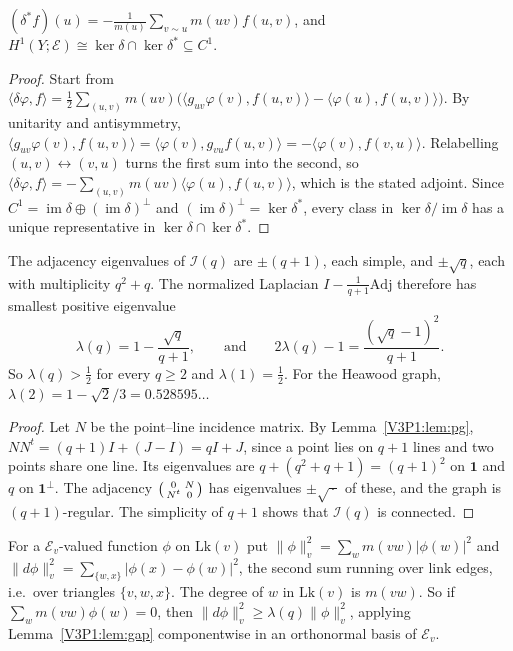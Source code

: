 \begin{lemma}\label{V3P1:lem:adjoint}
$(\delta^{*}f)(u)=-\frac1{m(u)}\sum_{v\sim u}m(uv)f(u,v)$, and
$H^{1}(Y;\mathcal E)\cong\ker\delta\cap\ker\delta^{*}\subseteq C^{1}$.
\end{lemma}

\begin{proof}
Start from $\langle\delta\varphi,f\rangle=\tfrac12\sum_{(u,v)}m(uv)\bigl(\langle g_{uv}\varphi(v),
f(u,v)\rangle-\langle\varphi(u),f(u,v)\rangle\bigr)$. By unitarity and antisymmetry,
$\langle g_{uv}\varphi(v),f(u,v)\rangle=\langle\varphi(v),g_{vu}f(u,v)\rangle
=-\langle\varphi(v),f(v,u)\rangle$. Relabelling $(u,v)\leftrightarrow(v,u)$ turns the first
sum into the second, so $\langle\delta\varphi,f\rangle=-\sum_{(u,v)}m(uv)\langle\varphi(u),
f(u,v)\rangle$, which is the stated adjoint. Since $C^{1}=\operatorname{im}\delta\oplus
(\operatorname{im}\delta)^{\perp}$ and $(\operatorname{im}\delta)^{\perp}=\ker\delta^{*}$,
every class in $\ker\delta/\operatorname{im}\delta$ has a unique representative in
$\ker\delta\cap\ker\delta^{*}$.
\end{proof}

\begin{lemma}\label{V3P1:lem:gap}
The adjacency eigenvalues of $\mathcal I(q)$ are $\pm(q+1)$, each simple, and $\pm\sqrt q$,
each with multiplicity $q^{2}+q$. The normalized Laplacian $I-\frac1{q+1}\mathrm{Adj}$
therefore has smallest positive eigenvalue
\[
\lambda(q)=1-\frac{\sqrt q}{q+1},\qquad\text{and}\qquad 2\lambda(q)-1=\frac{(\sqrt q-1)^{2}}{q+1}.
\]
So $\lambda(q)>\tfrac12$ for every $q\ge2$ and $\lambda(1)=\tfrac12$. For the Heawood graph,
$\lambda(2)=1-\sqrt2/3=0.528595\ldots$
\end{lemma}

\begin{proof}
Let $N$ be the point--line incidence matrix. By Lemma~\ref{V3P1:lem:pg},
$NN^{t}=(q+1)I+(J-I)=qI+J$, since a point lies on $q+1$ lines and two points share one line.
Its eigenvalues are $q+(q^{2}+q+1)=(q+1)^{2}$ on $\mathbf 1$ and $q$ on $\mathbf 1^{\perp}$.
The adjacency $\begin{psmallmatrix}0&N\\N^{t}&0\end{psmallmatrix}$ has eigenvalues
$\pm\sqrt{\,\cdot\,}$ of these, and the graph is $(q+1)$-regular. The simplicity of $q+1$
shows that $\mathcal I(q)$ is connected.
\end{proof}

For a $\mathcal E_v$-valued function $\phi$ on $\mathrm{Lk}(v)$ put
$\|\phi\|^{2}_{v}=\sum_{w}m(vw)|\phi(w)|^{2}$ and $\|d\phi\|^{2}_{v}=\sum_{\{w,x\}}|\phi(x)-\phi(w)|^{2}$,
the second sum running over link edges, i.e.\ over triangles $\{v,w,x\}$. The degree of $w$
in $\mathrm{Lk}(v)$ is $m(vw)$. So if $\sum_wm(vw)\phi(w)=0$, then
$\|d\phi\|_v^{2}\ge\lambda(q)\|\phi\|_v^{2}$, applying Lemma~\ref{V3P1:lem:gap} componentwise
in an orthonormal basis of $\mathcal E_v$.

